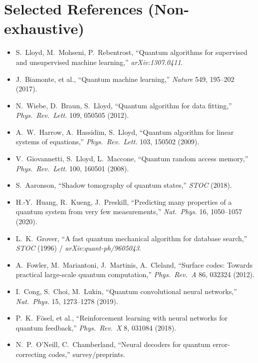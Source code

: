 \documentclass[11pt]{article}
\begin{document}
\section*{Selected References (Non-exhaustive)}
\vspace{-0.5em}
\begin{itemize}\itemsep0.2em
\item S.\ Lloyd, M.\ Mohseni, P.\ Rebentrost, ``Quantum algorithms for supervised and unsupervised machine learning,'' \emph{arXiv:1307.0411}.
\item J.\ Biamonte, et al., ``Quantum machine learning,'' \emph{Nature} 549, 195--202 (2017).
\item N.\ Wiebe, D.\ Braun, S.\ Lloyd, ``Quantum algorithm for data fitting,'' \emph{Phys.\ Rev.\ Lett.} 109, 050505 (2012).
\item A.\ W.\ Harrow, A.\ Hassidim, S.\ Lloyd, ``Quantum algorithm for linear systems of equations,'' \emph{Phys.\ Rev.\ Lett.} 103, 150502 (2009).
\item V.\ Giovannetti, S.\ Lloyd, L.\ Maccone, ``Quantum random access memory,'' \emph{Phys.\ Rev.\ Lett.} 100, 160501 (2008).
\item S.\ Aaronson, ``Shadow tomography of quantum states,'' \emph{STOC} (2018).
\item H.-Y.\ Huang, R.\ Kueng, J.\ Preskill, ``Predicting many properties of a quantum system from very few measurements,'' \emph{Nat.\ Phys.} 16, 1050–1057 (2020).
\item L.\ K.\ Grover, ``A fast quantum mechanical algorithm for database search,'' \emph{STOC} (1996) / \emph{arXiv:quant-ph/9605043}.
\item A.\ Fowler, M.\ Mariantoni, J.\ Martinis, A.\ Cleland, ``Surface codes: Towards practical large-scale quantum computation,'' \emph{Phys.\ Rev.\ A} 86, 032324 (2012).
\item I.\ Cong, S.\ Choi, M.\ Lukin, ``Quantum convolutional neural networks,'' \emph{Nat.\ Phys.} 15, 1273–1278 (2019).
\item P.\ K.\ F\"osel, et al., ``Reinforcement learning with neural networks for quantum feedback,'' \emph{Phys.\ Rev.\ X} 8, 031084 (2018).
\item N.\ P.\ O'Neill, C.\ Chamberland, ``Neural decoders for quantum error-correcting codes,'' survey/preprints.
\end{itemize}
\end{document}
